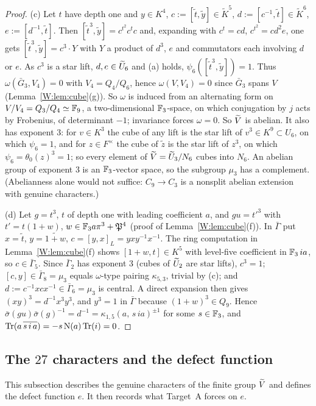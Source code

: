 \begin{proof}
(c) Let $t$ have depth one and $y\in K^4$, $c:=[\tilde t,\tilde y]\in\tilde K^5$,
$d:=[c^{-1},\tilde t]\in\tilde K^6$, $e:=[d^{-1},\tilde t]$.  Then
$[\tilde t^3,\tilde y]=c^{t^2}c^{t}c$ and, expanding with $c^t=cd$,
$c^{t^2}=cd^2e$, one gets $[\tilde t^3,\tilde y]=c^3\cdot Y$ with $Y$ a
product of $d^3$, $e$ and commutators each involving $d$ or $e$.  As
$c^3$ is a star lift, $d,e\in\widetilde U_6$ and (a) holds, $\psi_6([\tilde t^3,\tilde y])=1$.
Thus $\omega(\bar G_3,V_4)=0$ with $V_4=Q_4/Q_6$, hence $\omega(V,V_4)=0$
since $\bar G_3$ spans $V$ (Lemma~\ref{W:lem:cube}(g)).  So $\omega$ is
induced from an alternating form on $V/V_4=Q_3/Q_4\simeq\mathbb F_9$, a
two-dimensional $\mathbb F_3$-space, on which conjugation by $j$ acts by
Frobenius, of determinant $-1$; invariance forces $\omega=0$.  So $\widetilde V$
is abelian.  It also has exponent $3$: for $v\in K^3$ the cube of any
lift is the star lift of $v^3\in K^9\subset U_6$, on which $\psi_6=1$,
and for $z\in F^\times$ the cube of $\tilde z$ is the star lift of
$z^3$, on which $\psi_6=\theta_0(z)^3=1$; so every element of
$\widetilde V=\widetilde U_3/N_6$ cubes into $N_6$.  An abelian group of exponent $3$ is
an $\mathbb F_3$-vector space, so the subgroup $\mu_3$ has a complement.
(Abelianness alone would not suffice: $C_9\to C_3$ is a nonsplit abelian
extension with genuine characters.)

(d) Let $g=t^3$, $t$ of depth one with leading coefficient $a$, and
$gu=t'^3$ with $t'=t(1+w)$, $w\in\mathbb F_3a\pi^3+\mathfrak P^4$
(proof of Lemma~\ref{W:lem:cube}(f)).  In $\bar\Gamma$ put $x=\tilde t$,
$y=\widetilde{1+w}$, $c=[y,x]_L=yxy^{-1}x^{-1}$.  The ring computation
in Lemma~\ref{W:lem:cube}(f) shows $[1+w,t]\in K^5$ with level-five
coefficient in $\mathbb F_3\,ia$, so $c\in\bar\Gamma_5$.  Since $\bar\Gamma_2$
has exponent $3$ (cubes of $\widetilde U_2$ are star lifts), $c^3=1$;
$[c,y]\in\bar\Gamma_8=\mu_3$ equals $\omega$-type pairing $\kappa_{5,3}$,
trivial by (c); and $d:=c^{-1}xcx^{-1}\in\bar\Gamma_6=\mu_3$ is central.
A direct expansion then gives $(xy)^3=d^{-1}x^3y^3$, and $y^3=1$ in
$\bar\Gamma$ because $(1+w)^3\in Q_9$.  Hence
$\bar\sigma(gu)\bar\sigma(g)^{-1}=d^{-1}=\kappa_{1,5}(a,\,s\,ia)^{\pm1}$
for some $s\in\mathbb F_3$, and $\operatorname{Tr}(a\,\overline{s\,i\,a})=-s\operatorname N(a)\operatorname{Tr}(i)=0$.
\end{proof}

\subsection{The $27$ characters and the defect function}
This subsection describes the genuine characters of the finite group $\widetilde V$ and defines the defect function $e$. It then records what Target~A forces on $e$.

